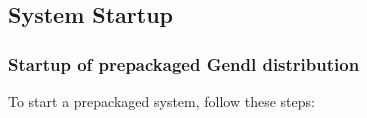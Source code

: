 \documentclass [11pt]{book}
\begin{document}
\label{sec:systemstartupandtesting}



\subsection{System Startup}

\label{subsec:systemstartup}



\subsubsection{Startup of prepackaged Gendl distribution}

\label{subsubsec:startupofprepackagedgendldistribution}

To start a prepackaged system, follow these steps:
\end{document}
